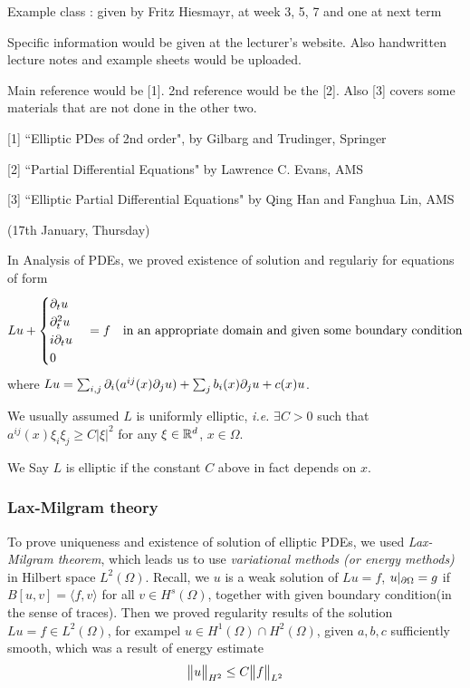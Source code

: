 \documentclass[12pt,a4paper]{article}
\begin{document}
Example class : given by Fritz Hiesmayr, at week 3, 5, 7 and one at next term

Specific information would be given at the lecturer's website. Also handwritten lecture notes and example sheets would be uploaded.

Main reference would be [1]. 2nd reference would be the [2]. Also [3] covers some materials that are not done in the other two.
\s

[1] ``Elliptic PDes of 2nd order", by Gilbarg and Trudinger, Springer

[2] ``Partial Differential Equations" by Lawrence C. Evans, AMS

[3] ``Elliptic Partial Differential Equations" by Qing Han and Fanghua Lin, AMS
\s

\newday

(17th January, Thursday)
\s

In Analysis of PDEs, we proved existence of solution and regulariy for equations of form
\begin{align*}
Lu + \begin{cases}
\partial_t u \\
\partial_t^2  u\\
i\partial_t u\\
0
\end{cases} = f \quad \text{in an appropriate domain and given some boundary condition} 
\end{align*}
where $Lu = \sum_{i,j} \partial_i (a^{ij}(x) \partial_j u) + \sum_j b_i(x)\partial_j u + c(x)u$.

\quad We usually assumed $L$ is uniformly elliptic, \textit{i.e.} $\exists C>0$ such that $a^{ij}(x)\xi_i \xi_j \geq C|\xi|^2$ for any $\xi \in \mathbb{R}^d$, $x\in \Omega$.

\quad We Say $L$ is elliptic if the constant $C$ above in fact depends on $x$. 
\s

\subsubsection*{Lax-Milgram theory}

To prove uniqueness and existence of solution of elliptic PDEs, we used \emph{Lax-Milgram theorem}, which leads us to use \emph{variational methods (or energy methods)} in Hilbert space $L^2(\Omega)$. Recall, we $u$ is a weak solution of $Lu =f$, $u|_{\partial \Omega}=g$ if $B[u,v]= \langle f,v\rangle$ for all $v\in H^s(\Omega)$, together with given boundary condition(in the sense of traces). Then we proved regularity results of the solution $Lu =f \in L^2(\Omega)$, for exampel $u\in H^1(\Omega) \cap H^2(\Omega)$, given $a,b,c$ sufficiently smooth, which was a result of energy estimate
\begin{align*}
\bigl\lVert u\bigr\rVert_{H^2}\leq C\bigl\lVert f\bigr\rVert_{L^2}
\end{align*}
\end{document}
